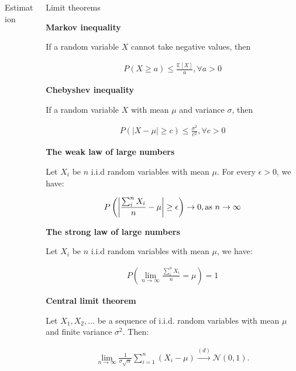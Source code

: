\documentclass{beamer}
\begin{document}
\begin{frame}
\begin{columns}
\begin{column}{0.3\textwidth}
\begin{block}{Estimation}
\end{block}

\end{column}

\begin{column}{0.3\textwidth}

\begin{block}{Limit theorems}

\textbf{Markov inequality}

If a random variable $X$ cannot take negative values, then

\begin{align*}
    P(X \geq a) \leq \frac{\mathbb{E}[X]}{a}, \forall a > 0
\end{align*}

\textbf{Chebyshev inequality}

If a random variable $X$ with mean $\mu$ and variance $\sigma$, then

\begin{align*}
    P(|X - \mu| \geq c) \leq \frac{\sigma^2}{c^2}, \forall c > 0
\end{align*}

\textbf{The weak law of large numbers}

Let $X_i$ be $n$ i.i.d random variables with mean $\mu$. For every $\epsilon > 0$, we have:

\begin{align*}
    P\left(\abs{\frac{\sum_i^n X_i}{n} - \mu} \geq \epsilon\right) \to 0, \text{as }  n \to \infty
\end{align*}

\textbf{The strong law of large numbers}

Let $X_i$ be $n$ i.i.d random variables with mean $\mu$, we have:

\begin{align*}
    P\left( \lim_{n \to \infty} \frac{\sum_i^n X_i}{n} = \mu\right) = 1
\end{align*}

\textbf{Central limit theorem}

Let $X_1, X_2, \ldots$ be a sequence of i.i.d. random variables with mean $\mu$ and finite variance $\sigma^2$. Then:

\begin{align*}
    \lim_{n \to \infty} \frac{1}{\sigma\sqrt{n}} \sum_{i=1}^{n} \left( X_i - \mu \right) \xrightarrow{(d)} \mathcal{N}(0, 1).
\end{align*}

\end{block}


\end{column}
\end{columns}
\end{frame}
\end{document}
